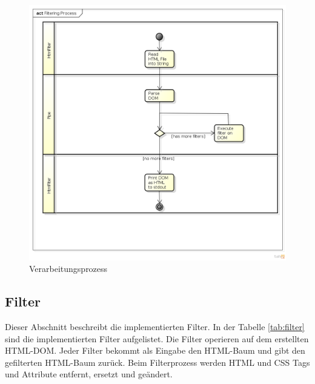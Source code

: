 \begin{figure}[ht]
	\begin{center}
		\includegraphics[width=1.0\textwidth]{./content/Filtering_Process_cut.png}
	\end{center}
	\caption{Verarbeitungsprozess}
	\label{fig:process}
\end{figure}

\subsection{Filter}

Dieser Abschnitt beschreibt die implementierten Filter. 
In der Tabelle \ref{tab:filter} sind die implementierten Filter aufgelistet. Die Filter operieren auf dem erstellten HTML-DOM.
Jeder Filter bekommt als Eingabe den HTML-Baum und gibt den gefilterten HTML-Baum zurück. 
Beim Filterprozess werden HTML und CSS Tags und Attribute entfernt, ersetzt und geändert.

